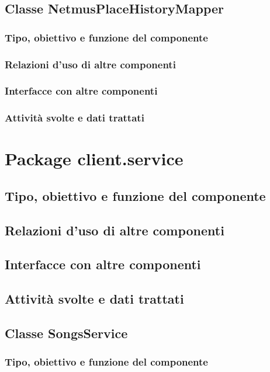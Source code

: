 \subsection{Classe NetmusPlaceHistoryMapper}
\subsubsection*{Tipo, obiettivo e funzione del componente}
\subsubsection*{Relazioni d'uso di altre componenti}
\subsubsection*{Interfacce con altre componenti}
\subsubsection*{Attivit\`a svolte e dati trattati}

\newpage
\section{Package client.service} %
\subsection*{Tipo, obiettivo e funzione del componente}
\subsection*{Relazioni d'uso di altre componenti}
\subsection*{Interfacce con altre componenti}
\subsection*{Attivit\`a svolte e dati trattati}

\subsection{Classe SongsService}
\subsubsection*{Tipo, obiettivo e funzione del componente}
